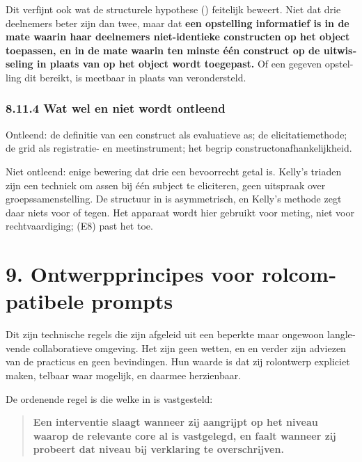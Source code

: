 \begin{dutch}
Dit verfijnt ook wat de structurele hypothese () feitelijk beweert. Niet dat drie deelnemers beter zijn dan twee, maar dat \textbf{een opstelling informatief is in de mate waarin haar deelnemers niet-identieke constructen op het object toepassen, en in de mate waarin ten minste één construct op de uitwisseling in plaats van op het object wordt toegepast.} Of een gegeven opstelling dit bereikt, is meetbaar in plaats van verondersteld.


\subsubsection*{8.11.4 Wat wel en niet wordt ontleend}
\label{sec:nl:8.11.4}

Ontleend: de definitie van een construct als evaluatieve as; de elicitatiemethode; de grid als registratie- en meetinstrument; het begrip constructonafhankelijkheid.

Niet ontleend: enige bewering dat drie een bevoorrecht getal is. Kelly's triaden zijn een techniek om assen bij één subject te eliciteren, geen uitspraak over groepssamenstelling. De structuur in  is asymmetrisch, en Kelly's methode zegt daar niets voor of tegen. Het apparaat wordt hier gebruikt voor meting, niet voor rechtvaardiging;  (E8) past het toe.


\section*{9. Ontwerpprincipes voor rolcompatibele prompts}
\label{sec:nl:9}

Dit zijn technische regels die zijn afgeleid uit een beperkte maar ongewoon langlevende collaboratieve omgeving. Het zijn geen wetten, en  en verder zijn adviezen van de practicus en geen bevindingen. Hun waarde is dat zij rolontwerp expliciet maken, telbaar waar mogelijk, en daarmee herzienbaar.

De ordenende regel is die welke in  is vastgesteld:

\begin{quote}
\textbf{Een interventie slaagt wanneer zij aangrijpt op het niveau waarop de relevante core al is vastgelegd, en faalt wanneer zij probeert dat niveau bij verklaring te overschrijven.}
\end{quote}


\end{dutch}
